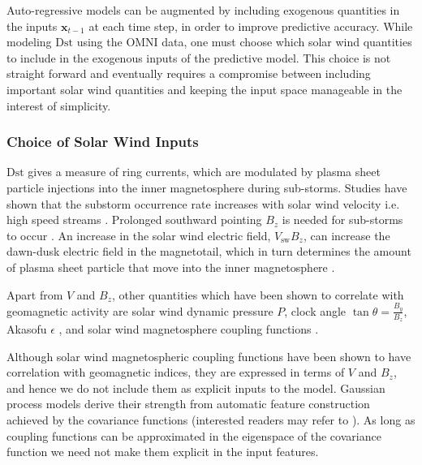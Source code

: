 Auto-regressive models can be augmented by including exogenous quantities in the inputs 
$\mathbf{x}_{t-1}$ at each time step, in order to improve predictive accuracy. While modeling 
$\mathrm{Dst}$ using the OMNI data, one must choose which solar wind quantities to include in the 
exogenous inputs of the predictive model. This choice is not straight forward and eventually 
requires a compromise between including important solar wind quantities and keeping the input 
space manageable in the interest of simplicity.

\subsubsection{Choice of Solar Wind Inputs}

$\mathrm{Dst}$ gives a measure of ring currents, which are modulated by plasma sheet particle 
injections into the inner magnetosphere during sub-storms. Studies have shown that the substorm 
occurrence rate increases with solar wind velocity i.e. high speed streams 
\citep{Kissinger2011,Newell2016}. Prolonged southward pointing $B_z$ is needed 
for sub-storms to occur \citep{McPherron1986}. An increase in the solar wind electric field, 
$V_{\text{sw}}B_z$, can increase the dawn-dusk electric field in the magnetotail, which in turn 
determines the amount of plasma sheet particle that move into the inner magnetosphere 
\citep{Friedel2001}. 

Apart from $V$ and $B_z$, other quantities which have been shown to correlate with geomagnetic 
activity are solar wind dynamic pressure $P$, clock angle $\tan \theta = \frac{B_y}{B_z}$, Akasofu 
$\epsilon$ \citep{1986AkasofuE}, and solar wind magnetosphere coupling functions 
\citep{JGRA:JGRA21451}. 

Although solar wind magnetospheric coupling functions have been shown to have correlation with 
geomagnetic indices, they are expressed in terms of $V$ and $B_z$, and hence we do not include them 
as explicit inputs to the model. Gaussian process models derive their strength from 
automatic feature construction achieved by the covariance functions (interested readers may refer 
to \citet[ch.~6 \& 7]{Rasmussen:2005:GPM:1162254}). As long as coupling functions can be 
approximated in the eigenspace of the covariance function we need not make them explicit in 
the input features. 

